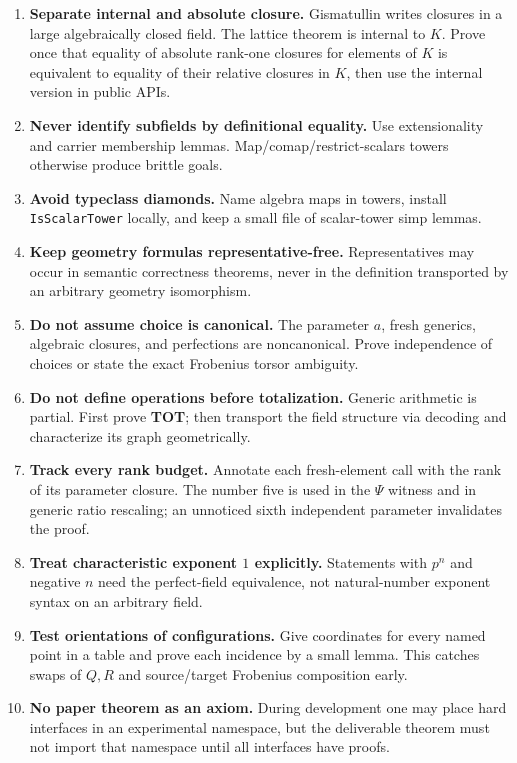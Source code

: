 \documentclass[11pt,oneside]{article}
\theoremstyle{definition}
\theoremstyle{remark}
\newcommand{\lean}[1]{\nolinkurl{#1}}
\begin{document}
\begin{enumerate}[leftmargin=8mm]
\item \textbf{Separate internal and absolute closure.}  Gismatullin writes closures in a
large algebraically closed field.  The lattice theorem is internal to $K$.  Prove once
that equality of absolute rank-one closures for elements of $K$ is equivalent to equality
of their relative closures in $K$, then use the internal version in public APIs.
\item \textbf{Never identify subfields by definitional equality.}  Use extensionality and
carrier membership lemmas.  Map/comap/restrict-scalars towers otherwise produce brittle
goals.
\item \textbf{Avoid typeclass diamonds.}  Name algebra maps in towers, install
\lean{IsScalarTower} locally, and keep a small file of scalar-tower simp lemmas.
\item \textbf{Keep geometry formulas representative-free.}  Representatives may occur in
semantic correctness theorems, never in the definition transported by an arbitrary
geometry isomorphism.
\item \textbf{Do not assume choice is canonical.}  The parameter $a$, fresh generics,
algebraic closures, and perfections are noncanonical.  Prove independence of choices or
state the exact Frobenius torsor ambiguity.
\item \textbf{Do not define operations before totalization.}  Generic arithmetic is
partial.  First prove \textbf{TOT}; then transport the field structure via decoding and
characterize its graph geometrically.
\item \textbf{Track every rank budget.}  Annotate each fresh-element call with the rank of
its parameter closure.  The number five is used in the $\Psi$ witness and in generic
ratio rescaling; an unnoticed sixth independent parameter invalidates the proof.
\item \textbf{Treat characteristic exponent $1$ explicitly.}  Statements with
$p^n$ and negative $n$ need the perfect-field equivalence, not natural-number exponent
syntax on an arbitrary field.
\item \textbf{Test orientations of configurations.}  Give coordinates for every named
point in a table and prove each incidence by a small lemma.  This catches swaps of $Q,R$
and source/target Frobenius composition early.
\item \textbf{No paper theorem as an axiom.}  During development one may place hard
interfaces in an experimental namespace, but the deliverable theorem must not import that
namespace until all interfaces have proofs.
\end{enumerate}
\end{document}
